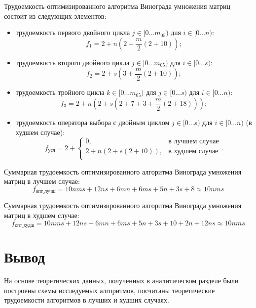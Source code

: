 Трудоемкость оптимизированного алгоритма Винограда умножения матриц состоит из следующих элементов:
\begin{itemize}
	\item трудоемкость первого двойного цикла $j \in [0...m_05)$ для $i \in [0...n)$:
	\begin{equation}
		f_1 = 2 + n(2 + \frac{m}{2}(2 + 10));
	\end{equation}
	\item трудоемкость второго двойного цикла $j \in [0...m_05)$ для $i \in [0...s)$:
	\begin{equation}
		f_2 = 2 + s(3 + \frac{m}{2}(2 + 10));
	\end{equation}
	\item трудоемкость тройного цикла  $k \in [0...m_05)$ для $j \in [0...s)$ для $i \in [0...n)$:
	\begin{equation}
		f_3 = 2 + n(2 + s(2 + 7 + 3 + \frac{m}{2}(2 + 18)));
	\end{equation}
	\item трудоемкость оператора выбора с двойным циклом $j \in [0...s)$ для $i \in [0...n)$ (в худшем случае):
	\begin{equation}
		f_{\text{усл}} = 2 + 
		\begin{cases}
			0, & \text{в лучшем случае}\\
			2 + n(2 + s(2 + 10)), & \text{в худшем случае}\\
		\end{cases}.
	\end{equation}
\end{itemize}

Суммарная трудоемкость оптимизированного алгоритма Винограда умножения матриц в лучшем случае:
\begin{equation}
	f_{\text{опт\_лучш}} = 10nms + 12ns + 6mn + 6ms + 5n + 3s + 8 \approx 10nms
\end{equation}

Суммарная трудоемкость оптимизированного алгоритма Винограда умножения матриц в худшем случае:
\begin{equation}
	f_{\text{опт\_худш}} = 10nms + 12ns + 6mn + 6ms + 5n + 3s + 10 + 2n + 12ns\approx 10nms
\end{equation}

\section*{Вывод}
На основе теоретических данных, полученных в аналитическом разделе были построены схемы исследуемых алгоритмов, посчитаны теоретические трудоемкости алгоритмов в лучших и худших случаях.